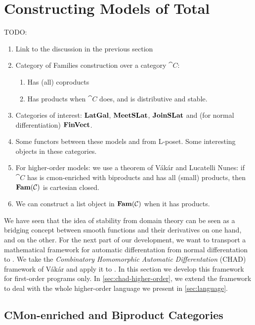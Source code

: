 \section{Constructing Models of Total \GPS}
\label{sec:models-of-total-gps}

TODO:
\begin{enumerate}
\item Link to the discussion in the previous section
\item Category of Families construction over a category $\cat{C}$:
  \begin{enumerate}
  \item Has (all) coproducts
  \item Has products when $\cat{C}$ does, and is distributive and
    stable.
  \end{enumerate}
\item Categories of interest: $\mathbf{LatGal}$, $\mathbf{MeetSLat}$, $\mathbf{JoinSLat}$ and
  (for normal differentiation) $\mathbf{FinVect}$.
\item Some functors between these models and from L-poset. Some
  interesting objects in these categories.
\item For higher-order models: we use a theorem of Vákár and Lucatelli
  Nunes: if $\cat{C}$ has is cmon-enriched with biproducts and has all
  (small) products, then $\mathbf{Fam}(\mathcal{C})$ is cartesian closed.
\item We can construct a list object in $\mathbf{Fam}(\mathcal{C})$ when it has
  products.
\end{enumerate}




We have seen that the idea of stability from domain theory can be seen
as a bridging concept between smooth functions and their derivatives
on one hand, and \GPS on the other. For the next part of our
development, we want to transport a mathematical framework for
automatic differentation from normal differentation to \GPS. We take
the \emph{Combinatory Homomorphic Automatic Differentation} (CHAD)
framework of Vákár \etal{} and apply it to \GPS. In this section we
develop this framework for first-order programs only. In
\autoref{sec:chad-higher-order}, we extend the framework to deal with
the whole higher-order language we present in \autoref{sec:language}.

\subsection{CMon-enriched and Biproduct Categories}

